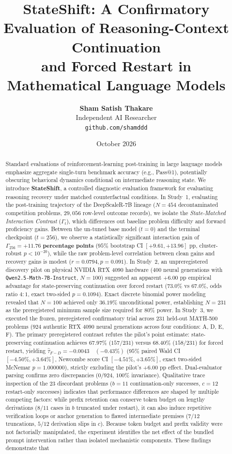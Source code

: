 \documentclass[11pt]{article}
\title{\textbf{StateShift: A Confirmatory Evaluation of Reasoning-Context Continuation\\and Forced Restart in Mathematical Language Models}}
\author{
  \textbf{Sham Satish Thakare} \\
  Independent AI Researcher \\
  \texttt{github.com/shamddd} \\
}
\date{October 2026}
\begin{document}
\maketitle

\begin{abstract}
Standard evaluations of reinforcement-learning post-training in large language models emphasize aggregate single-turn benchmark accuracy (e.g., Pass@1), potentially obscuring behavioral dynamics conditional on intermediate reasoning state. We introduce \textbf{StateShift}, a controlled diagnostic evaluation framework for evaluating reasoning recovery under matched counterfactual conditions. In Study~1, evaluating the post-training trajectory of the DeepScaleR-7B lineage ($N=454$ decontaminated competition problems, $29,056$ row-level outcome records), we isolate the \emph{State-Matched Interaction Contrast} ($\Gamma_t$), which differences out baseline problem difficulty and forward proficiency gains. Between the un-tuned base model ($t=0$) and the terminal checkpoint ($t=256$), we observe a statistically significant interaction gain of $\Gamma_{256} = \mathbf{+11.76\text{ percentage points}}$ ($95\%$ bootstrap CI $[+9.61, +13.96]\text{ pp}$, cluster-robust $p < 10^{-20}$), while the raw problem-level correlation between clean gains and recovery gains is modest ($r = 0.0794, p = 0.091$). In Study~2, an unpreregistered discovery pilot on physical NVIDIA RTX 4090 hardware ($400$ neural generations with \texttt{Qwen2.5-Math-7B-Instruct}, $N=100$) suggested an apparent $+6.00\text{ pp}$ empirical advantage for state-preserving continuation over forced restart ($73.0\%$ vs $67.0\%$, odds ratio $4:1$, exact two-sided $p = 0.1094$). Exact discrete binomial power modeling revealed that $N=100$ achieved only $36.19\%$ unconditional power, establishing $N=231$ as the preregistered minimum sample size required for $80\%$ power. In Study~3, we executed the frozen, preregistered confirmatory trial across $231$ held-out MATH-500 problems ($924$ authentic RTX 4090 neural generations across four conditions: A, D, E, F). The primary preregistered contrast refutes the pilot's point estimate: state-preserving continuation achieves $67.97\%$ ($157/231$) versus $68.40\%$ ($158/231$) for forced restart, yielding $\hat{\tau}_{F-D} = \mathbf{-0.0043 \quad (-0.43\%)}$ ($95\%$ paired Wald CI $[-4.50\%, +3.64\%]$, Newcombe score CI $[-4.51\%, +3.65\%]$, exact two-sided McNemar $p = \mathbf{1.000000}$), strictly excluding the pilot's $+6.00\text{ pp}$ effect. Dual-evaluator parsing confirms zero discrepancies ($0/924$, $100\%$ invariance). Qualitative trace inspection of the $23$ discordant problems ($b=11$ continuation-only successes, $c=12$ restart-only successes) indicates that performance differences are shaped by multiple competing factors: while prefix retention can conserve token budget on lengthy derivations ($8/11$ cases in $b$ truncated under restart), it can also induce repetitive verification loops or anchor generation to flawed intermediate premises ($7/12$ truncations, $5/12$ derivation slips in $c$). Because token budget and prefix validity were not factorially manipulated, the experiment identifies the net effect of the bundled prompt intervention rather than isolated mechanistic components. These findings demonstrate that 
\end{abstract}
\end{document}
